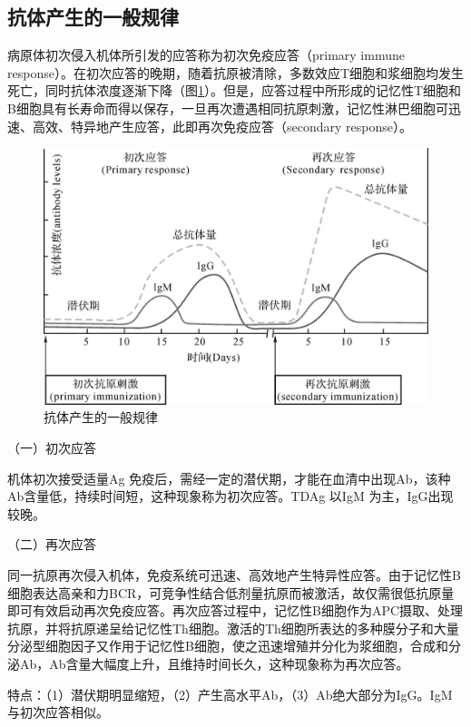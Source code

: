 \subsection{抗体产生的一般规律}

病原体初次侵入机体所引发的应答称为初次免疫应答（primary immune
response）。在初次应答的晚期，随着抗原被清除，多数效应T细胞和浆细胞均发生死亡，同时抗体浓度逐渐下降（图\ref{fig9-20}）。但是，应答过程中所形成的记忆性T细胞和B细胞具有长寿命而得以保存，一旦再次遭遇相同抗原刺激，记忆性淋巴细胞可迅速、高效、特异地产生应答，此即再次免疫应答（secondary
response）。

\begin{figure}[!htbp]
 \centering
 \includegraphics{./images/Image00146.jpg}
 \captionsetup{justification=centering}
 \caption{抗体产生的一般规律}
 \label{fig9-20}
  \end{figure} 

（一）初次应答

机体初次接受适量Ag
免疫后，需经一定的潜伏期，才能在血清中出现Ab，该种Ab含量低，持续时间短，这种现象称为初次应答。TDAg
以IgM 为主，IgG出现较晚。

（二）再次应答

同一抗原再次侵入机体，免疫系统可迅速、高效地产生特异性应答。由于记忆性B细胞表达高亲和力BCR，可竞争性结合低剂量抗原而被激活，故仅需很低抗原量即可有效启动再次免疫应答。再次应答过程中，记忆性B细胞作为APC摄取、处理抗原，并将抗原递呈给记忆性Th细胞。激活的Th细胞所表达的多种膜分子和大量分泌型细胞因子又作用于记忆性B细胞，使之迅速增殖并分化为浆细胞，合成和分泌Ab，Ab含量大幅度上升，且维持时间长久，这种现象称为再次应答。

特点：（1）潜伏期明显缩短，（2）产生高水平Ab，（3）Ab绝大部分为IgG。IgM与初次应答相似。

